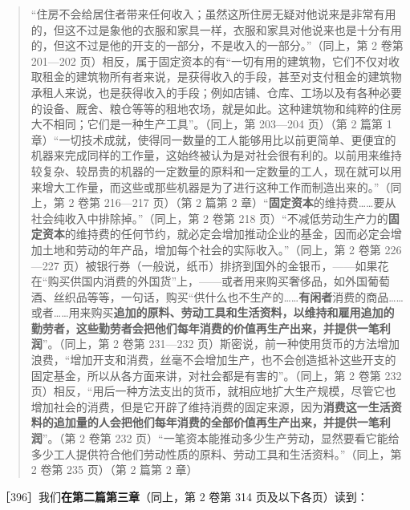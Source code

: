 \begin{quote}“住房不会给居住者带来任何收入；虽然这所住房无疑对他说来是非常有用的，但这不过是象他的衣服和家具一样，衣服和家具对他说来也是十分有用的，但这不过是他的开支的一部分，不是收入的一部分。”（同上，第 2 卷第 201—202 页）相反，属于固定资本的有“一切有用的建筑物，它们不仅对收取租金的建筑物所有者来说，是获得收入的手段，甚至对支付租金的建筑物承租人来说，也是获得收入的手段；例如店铺、仓库、工场以及有各种必要的设备、厩舍、粮仓等等的租地农场，就是如此。这种建筑物和纯粹的住房大不相同；它们是一种生产工具”。（同上，第 203—204 页）（第 2 篇第 1 章）“一切技术成就，使得同一数量的工人能够用比以前更简单、更便宜的机器来完成同样的工作量，这始终被认为是对社会很有利的。以前用来维持较复杂、较昂贵的机器的一定数量的原料和一定数量的工人，现在就可以用来增大工作量，而这些或那些机器是为了进行这种工作而制造出来的。”（同上，第 2 卷第 216—217 页）（第 2 篇第 2 章）“\textbf{固定资本}的维持费……要从社会纯收入中排除掉。”（同上，第 2 卷第 218 页）“不减低劳动生产力的\textbf{固定资本}的维持费的任何节约，就必定会增加推动企业的基金，因而必定会增加土地和劳动的年产品，增加每个社会的实际收入。”（同上，第 2 卷第 226—227 页）被银行券（一般说，纸币）排挤到国外的金银币，——如果花在“购买供国内消费的外国货”上，——或者用来购买奢侈品，如外国葡萄酒、丝织品等等，一句话，购买“供什么也不生产的……\textbf{有闲者}消费的商品……或者……用来购买\textbf{追加的原料、劳动工具和生活资料，以维持和雇用追加的勤劳者，这些勤劳者会把他们每年消费的价值再生产出来，并提供一笔利润}”。（同上，第 2 卷第 231—232 页）斯密说，前一种使用货币的方法增加浪费，“增加开支和消费，丝毫不会增加生产，也不会创造抵补这些开支的固定基金，所以从各方面来讲，对社会都是有害的”。（同上，第 2 卷第 232 页）相反，“用后一种方法支出的货币，就相应地扩大生产规模，尽管它也增加社会的消费，但是它开辟了维持消费的固定来源，因为\textbf{消费这一生活资料的追加量的人会把他们每年消费的全部价值再生产出来，并提供一笔利润}”。（第 2 卷第 232 页）“一笔资本能推动多少生产劳动，显然要看它能给多少工人提供符合他们劳动性质的原料、劳动工具和生活资料。”（同上，第 2 卷第 235 页）（第 2 篇第 2 章）\end{quote}

［396］我们\textbf{在第二篇第三章}（同上，第 2 卷第 314 页及以下各页）读到：

